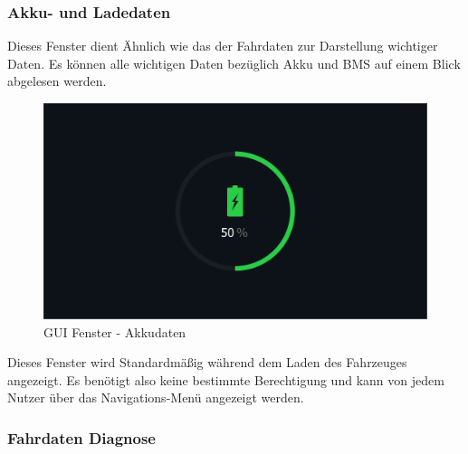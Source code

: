 \newpage

\subsubsection{Akku- und Ladedaten}

Dieses Fenster dient Ähnlich wie das der Fahrdaten zur Darstellung wichtiger Daten. Es können alle wichtigen Daten bezüglich Akku und BMS auf einem Blick abgelesen werden. 

\begin{figure}[H]
	\begin{center}
		\includegraphics[scale=0.25]{figures/hcis/window_battery.png}
			\caption{GUI Fenster - Akkudaten}
			\label{fig:pageAkku}
	\end{center}
\end{figure}

Dieses Fenster wird Standardmäßig während dem Laden des Fahrzeuges angezeigt. Es benötigt also keine bestimmte Berechtigung und kann von jedem Nutzer über das Navigations-Menü angezeigt werden.

\subsubsection{Fahrdaten Diagnose}


